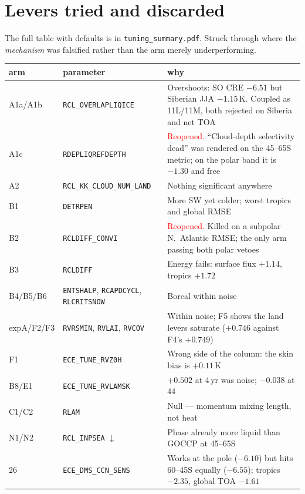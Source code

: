\documentclass[10pt]{article}
\begin{document}
\section{Levers tried and discarded}\label{sec:discarded}
The full table with defaults is in \texttt{tuning\_summary.pdf}. Struck through where the
\emph{mechanism} was falsified rather than the arm merely underperforming.

\begin{center}\footnotesize
\begin{tabular}{p{} p{} p{}}
\toprule
arm & parameter & why \\
\midrule
A1a/A1b & \texttt{RCL\_OVERLAPLIQICE} & Overshoots: SO CRE $-6.51$ but Siberian JJA
$-1.15$\,K. Coupled as 11L/11M, both rejected on Siberia and net TOA \\
A1c & \texttt{RDEPLIQREFDEPTH} & \textcolor{red}{Reopened.} ``Cloud-depth selectivity dead''
was rendered on the 45--65S metric; on the polar band it is $-1.30$ and free \\
A2 & \texttt{RCL\_KK\_CLOUD\_NUM\_LAND} & Nothing significant anywhere \\
B1 & \texttt{DETRPEN} & More SW yet colder; worst tropics and global RMSE \\
B2 & \texttt{RCLDIFF\_CONVI} & \textcolor{red}{Reopened.} Killed on a subpolar N.\ Atlantic
RMSE; the only arm passing both polar vetoes \\
B3 & \texttt{RCLDIFF} & Energy fails: surface flux $+1.14$, tropics $+1.72$ \\
B4/B5/B6 & \texttt{ENTSHALP}, \texttt{RCAPDCYCL}, \texttt{RLCRITSNOW} & Boreal within noise \\
expA/F2/F3 & \texttt{RVRSMIN}, \texttt{RVLAI}, \texttt{RVCOV} & Within noise; F5 shows the
land levers saturate ($+0.746$ against F4's $+0.749$) \\
F1 & \texttt{ECE\_TUNE\_RVZ0H} & Wrong side of the column: the skin bias is $+0.11$\,K \\
B8/E1 & \texttt{ECE\_TUNE\_RVLAMSK} & $+0.502$ at 4\,yr was noise; $-0.038$ at 44 \\
C1/C2 & \texttt{RLAM} & Null --- momentum mixing length, not heat \\
N1/N2 & \texttt{RCL\_INPSEA} $\downarrow$ & Phase already more liquid than GOCCP at 45--65S \\
26 & \texttt{ECE\_DMS\_CCN\_SENS} & Works at the pole ($-6.10$) but hits 60--45S equally
($-6.55$); tropics $-2.35$, global TOA $-1.61$ \\

\end{tabular}
\end{center}
\end{document}
